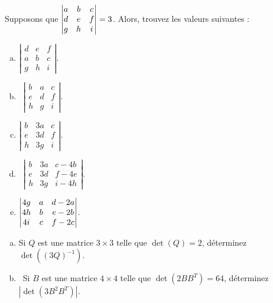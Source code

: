 \begin{prob}
\begin{enumerate}[a)]
\end{enumerate}

\end{prob} \begin{prob} \label{prob21.2} Supposons que $\left|\begin{matrix} a&b&c\cr d&e&f\cr g&h&i\end{matrix} \right|=3$. Alors, 
trouvez les valeurs suivantes :
\medskip
\begin{enumerate}[a)]
 
\item $\left|\begin{matrix}  d&e&f \\ a&b&c\\ g&h&i\end{matrix}\right|$.
\medskip
\item\sov~$\left|\begin{matrix}  b&a&c\\ e&d&f\\ h&g&i\end{matrix}\right|$.
\medskip
\item $\left|\begin{matrix}  b&3a&c\\ e&3d&f\\ h&3g&i\end{matrix}\right|$.
\medskip
\item\sov~$\left|\begin{matrix}  b&3a&c-4b\\ e&3d&f-4e\\ h&3g&i-4h\end{matrix}\right|$.
\medskip
\item $\left|\begin{matrix} 4g&a&d-2a\cr4h&b&e-2b\cr4i&c&f-2c \end{matrix}\right|$.
\medskip

\end{enumerate}

\end{prob} \begin{prob} 
\label{prob21.3} 

 

\begin{enumerate}[a)]


\item Si $Q$ est une matrice $3\times 3$ telle que $\det(Q)=2$, déterminez $\det((3Q)^{-1})$.
\medskip
\item\sov~Si $B$ est une matrice $4\times 4$ telle que $\det(2BB^T)=64$, déterminez $|\det(3B^2B^T)|$.
\medskip


\end{enumerate}
\end{prob}
